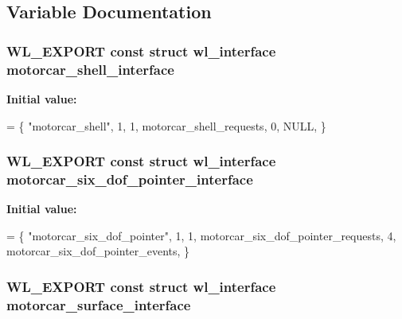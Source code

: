\subsection{Variable Documentation}
\hypertarget{motorcar-wayland-extensions_8c_af93f16d847b10210463edbe6017b9517}{
\subsubsection[{motorcar\-\_\-shell\-\_\-interface}]{\setlength{\rightskip}{0pt plus 5cm}W\-L\-\_\-\-E\-X\-P\-O\-R\-T const struct wl\-\_\-interface {\bf motorcar\-\_\-shell\-\_\-interface}}}\label{motorcar-wayland-extensions_8c_af93f16d847b10210463edbe6017b9517}
{\bfseries Initial value\-:}
\begin{DoxyCode}
= \{
    \textcolor{stringliteral}{"motorcar\_shell"}, 1,
    1, motorcar\_shell\_requests,
    0, NULL,
\}
\end{DoxyCode}
\hypertarget{motorcar-wayland-extensions_8c_a8218cfd9e117b255a79a328e88f0b741}{
\subsubsection[{motorcar\-\_\-six\-\_\-dof\-\_\-pointer\-\_\-interface}]{\setlength{\rightskip}{0pt plus 5cm}W\-L\-\_\-\-E\-X\-P\-O\-R\-T const struct wl\-\_\-interface {\bf motorcar\-\_\-six\-\_\-dof\-\_\-pointer\-\_\-interface}}}\label{motorcar-wayland-extensions_8c_a8218cfd9e117b255a79a328e88f0b741}
{\bfseries Initial value\-:}
\begin{DoxyCode}
= \{
    \textcolor{stringliteral}{"motorcar\_six\_dof\_pointer"}, 1,
    1, motorcar\_six\_dof\_pointer\_requests,
    4, motorcar\_six\_dof\_pointer\_events,
\}
\end{DoxyCode}
\hypertarget{motorcar-wayland-extensions_8c_a56acb8594d0103b3705453e8ea77915b}{
\subsubsection[{motorcar\-\_\-surface\-\_\-interface}]{\setlength{\rightskip}{0pt plus 5cm}W\-L\-\_\-\-E\-X\-P\-O\-R\-T const struct wl\-\_\-interface {\bf motorcar\-\_\-surface\-\_\-interface}}}\label{motorcar-wayland-extensions_8c_a56acb8594d0103b3705453e8ea77915b}
